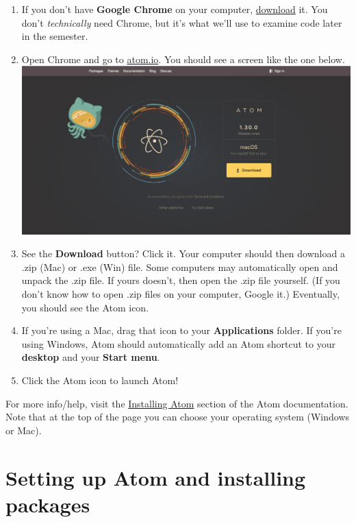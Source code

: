 \documentclass[]{book}
\providecommand{\tightlist}{%
  \setlength{\itemsep}{0pt}\setlength{\parskip}{0pt}}
\theoremstyle{definition}
\theoremstyle{definition}
\theoremstyle{definition}
\theoremstyle{remark}
\begin{document}
\begin{enumerate}
\def\labelenumi{\arabic{enumi}.}
\tightlist
\item
  If you don't have \textbf{Google Chrome} on your computer,
  \href{https://support.google.com/chrome/answer/95346?co=GENIE.Platform\%3DDesktop\&hl=en}{download}
  it. You don't \emph{technically} need Chrome, but it's what we'll use
  to examine code later in the semester.
\item
  Open Chrome and go to \href{https://atom.io/}{atom.io}. You should see
  a screen like the one below.\\
  \includegraphics{atom-getting-started.png}
\item
  See the \textbf{Download} button? Click it. Your computer should then
  download a .zip (Mac) or .exe (Win) file. Some computers may
  automatically open and unpack the .zip file. If yours doesn't, then
  open the .zip file yourself. (If you don't know how to open .zip files
  on your computer, Google it.) Eventually, you should see the Atom
  icon.
\item
  If you're using a Mac, drag that icon to your \textbf{Applications}
  folder. If you're using Windows, Atom should automatically add an Atom
  shortcut to your \textbf{desktop} and your \textbf{Start menu}.~
\item
  Click the Atom icon to launch Atom!
\end{enumerate}

For more info/help, visit the
\href{http://flight-manual.atom.io/getting-started/sections/installing-atom/\#platform-mac}{Installing
Atom} section of the Atom documentation. Note that at the top of the
page you can choose your operating system (Windows or Mac).

\hypertarget{setting-up-atom-and-installing-packages}{%
\section{Setting up Atom and installing
packages}\label{setting-up-atom-and-installing-packages}}
\end{document}
